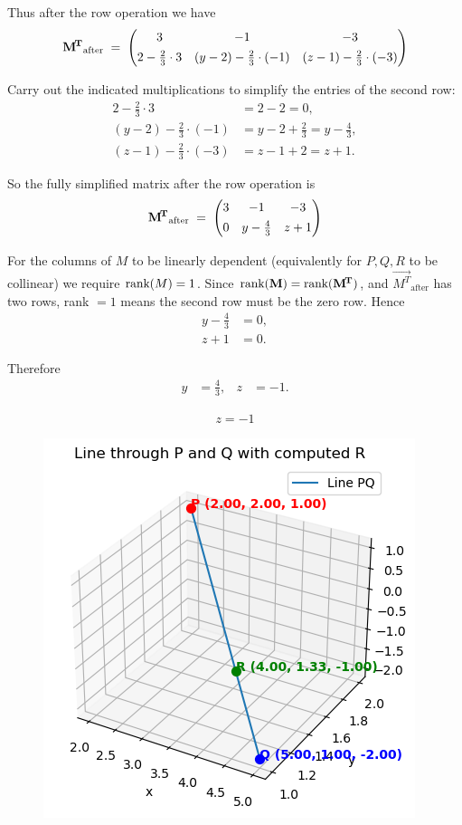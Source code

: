 \documentclass[12pt]{article}
\begin{document}
Thus after the row operation we have
\begin{align}
\mathbf{M^{\!T}}_{\text{after}} \;=\;
\begin{pmatrix}
3 & -1 & -3 \\[4pt]
2 - \tfrac{2}{3}\cdot 3 & (y-2) - \tfrac{2}{3}\cdot(-1) & (z-1) - \tfrac{2}{3}\cdot(-3)
\end{pmatrix}
\end{align}

Carry out the indicated multiplications to simplify the entries of the second row:
\begin{align}
2 - \tfrac{2}{3}\cdot 3 &= 2 - 2 = 0,\\[4pt]
(y-2) - \tfrac{2}{3}\cdot(-1) &= y - 2 + \tfrac{2}{3} = y - \tfrac{4}{3},\\[4pt]
(z-1) - \tfrac{2}{3}\cdot(-3) &= z - 1 + 2 = z + 1.
\end{align}

So the fully simplified matrix after the row operation is
\begin{align}
\mathbf{M^{\!T}}_{\text{after}} \;=\;
\begin{pmatrix}
3 & -1 & -3 \\[4pt]
0 & y - \tfrac{4}{3} & z + 1
\end{pmatrix}
\end{align}

For the columns of $M$ to be linearly dependent (equivalently for $P,Q,R$ to be collinear) we require $\text{rank}(M)=1$.  Since $\text{rank}(\mathbf{M})=\text{rank}(\mathbf{M^{\!T}})$, and $\vec{M^{\!T}}_{\text{after}}$ has two rows, rank $=1$ means the second row must be the zero row. Hence
\begin{align}
y - \tfrac{4}{3} &= 0,\\
z + 1 &= 0.
\end{align}

Therefore
\begin{align}
y &= \tfrac{4}{3}, & z &= -1.
\end{align}

\begin{align}
\boxed{z = -1}
\end{align}

\begin{figure}[H]
    \centering
    \includegraphics[width=0.7\columnwidth]{figs/line_3d.png}
    \caption{}
    \label{fig:placeholder}
\end{figure}
\end{document}
